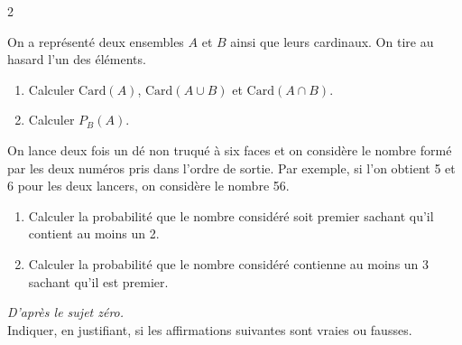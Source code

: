 \documentclass[a4paper,11pt]{article}
\begin{document}
\begin{multicols}{2}
\null\vfill

\begin{exercice}[title=Exercice 9 $\star\star$ { [Calculer] }]{}{}
  On a représenté deux ensembles $A$ et $B$ ainsi que leurs cardinaux. On tire au hasard l'un des éléments.
  
  \begin{center}
  \end{center}
  
  \begin{enumerate}
    \item Calculer $\mathrm{Card}(A)$, $\mathrm{Card}(A \cup B)$ et $\mathrm{Card}(A \cap B)$.
    \item Calculer $P_B(A)$.
  \end{enumerate}
\end{exercice}

\null\vfill

\begin{exercice}[title=Exercice 10 $\star\star$ { [Chercher, Modéliser] }]{}{}
  On lance deux fois un dé non truqué à six faces et on considère le nombre formé par les deux numéros pris dans l'ordre de sortie. Par exemple, si l'on obtient 5 et 6 pour les deux lancers, on considère le nombre 56.

  \begin{enumerate}[noitemsep]
    \item Calculer la probabilité que le nombre considéré soit premier sachant qu'il contient au moins un 2.
    \item Calculer la probabilité que le nombre considéré contienne au moins un 3 sachant qu'il est premier.
  \end{enumerate}
\end{exercice}

\null\vfill

\newcolumn

\begin{exercice}[title=Exercice 11 $\star\star$ { [Raisonner, Calculer] }]{}{}
  \emph{D'après le sujet zéro.} \\
  Indiquer, en justifiant, si les affirmations suivantes sont vraies ou fausses.
  

\end{exercice}
\end{multicols}
\end{document}
